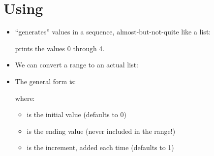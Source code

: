 \documentclass[letterpaper,10pt,english]{sphinxmanual}
\begin{document}
\section{Using }
\label{\detokenize{lecture_notes/lec10_lists2:using-range}}\begin{itemize}
\item {} 
 “generates” values in a sequence, almost-but-not-quite
like a list:

\begin{sphinxVerbatim}[commandchars=\\\{\}]
   
\end{sphinxVerbatim}

prints the values 0 through 4.

\item {} 
We can convert a range to an actual list:

\begin{sphinxVerbatim}[commandchars=\\\{\}]
  
\end{sphinxVerbatim}

\item {} 
The general form is:

\begin{sphinxVerbatim}[commandchars=\\\{\}]
  
\end{sphinxVerbatim}

where:
\begin{itemize}
\item {} 
 is the initial value (defaults to 0)

\item {} 
 is the ending value (never included in the range!)

\item {} 
 is the increment, added each time (defaults to 1)


\end{itemize}
\end{itemize}
\end{document}
